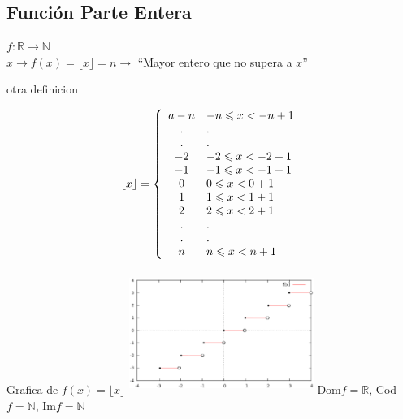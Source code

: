 \subsection{Función Parte Entera}
\begin{center}
$f: \mathbb{R} \longrightarrow \mathbb{N}$\\
$x \longrightarrow f(x) = \lfloor x \rfloor = n \rightarrow$ ``Mayor entero que no supera a $x$''
\end{center}
\hfill
\begin{minipage}{.45\textwidth}
\begin{center}
otra definicion
\end{center}
$$\lfloor x \rfloor=\left\{
\begin{array}{c l}a
  -n & -n\leqslant x < -n+1 \\
  . & . \\
  . & . \\
  -2 & -2 \leqslant x < -2+1 \\
  -1 & -1 \leqslant x < -1+1 \\
  0 & 0 \leqslant x < 0+1 \\
  1 & 1 \leqslant x < 1+1 \\
  2 & 2 \leqslant x < 2+1 \\
  . & . \\
  . & . \\
  n & n \leqslant x < n+1 \\
\end{array}
\right.$$

\end{minipage}
\hfill
\begin{minipage}{.45\textwidth}
\begin{center}
Grafica de $f(x)= \lfloor x \rfloor$
\includegraphics[height=4cm,width=6cm]{fpartent.eps} 
Dom$f = \mathbb{R}$, Cod$f = \mathbb{N}$, Im$f = \mathbb{N}$\\
\end{center}
\end{minipage}
\hfill
\\\\

